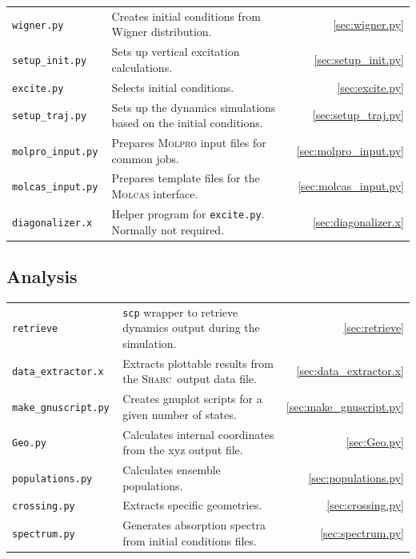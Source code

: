 \documentclass[a4paper,11pt,DIV=15,openany,twoside=false]{scrbook}
\newcommand{\sharc}{\textsc{Sharc}}
\newcommand{\ttt}[1]{\texttt{#1}}
\begin{document}
\begin{tabular}{>{\tt}lp{9.5cm}r}
  wigner.py             &Creates initial conditions from Wigner distribution.                   &\ref{sec:wigner.py}\\
  setup\_init.py        &Sets up vertical excitation calculations.                              &\ref{sec:setup_init.py}\\
  excite.py             &Selects initial conditions.                                            &\ref{sec:excite.py}\\
  setup\_traj.py        &Sets up the dynamics simulations based on the initial conditions.      &\ref{sec:setup_traj.py}\\
  molpro\_input.py      &Prepares \textsc{Molpro} input files for common jobs.                  &\ref{sec:molpro_input.py}\\
  molcas\_input.py      &Prepares template files for the \textsc{Molcas} interface.                  &\ref{sec:molcas_input.py}\\
  diagonalizer.x        &Helper program for \ttt{excite.py}. Normally not required.             &\ref{sec:diagonalizer.x}\\
\end{tabular}

\subsection{Analysis}

\begin{tabular}{>{\tt}lp{9.5cm}r}
  retrieve              &\ttt{scp} wrapper to retrieve dynamics output during the simulation.   &\ref{sec:retrieve}\\
  data\_extractor.x     &Extracts plottable results from the \sharc\ output data file.          &\ref{sec:data_extractor.x}\\
  make\_gnuscript.py    &Creates gnuplot scripts for a given number of states.                  &\ref{sec:make_gnuscript.py}\\
  Geo.py                &Calculates internal coordinates from the xyz output file.              &\ref{sec:Geo.py}\\
  populations.py        &Calculates ensemble populations.                                       &\ref{sec:populations.py}\\
  crossing.py           &Extracts specific geometries.                                    &\ref{sec:crossing.py}\\
  spectrum.py           &Generates absorption spectra from initial conditions files.            &\ref{sec:spectrum.py}\\
\end{tabular}
\end{document}

